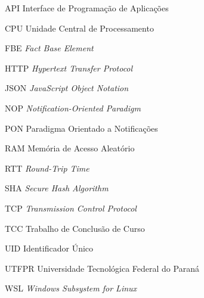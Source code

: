 \begin{siglas}
\item[API] Interface de Programação de Aplicações
\item[CPU] Unidade Central de Processamento
\item[FBE] \textit{Fact Base Element}
\item[HTTP] \textit{Hypertext Transfer Protocol}
\item[JSON] \textit{JavaScript Object Notation}
\item[NOP] \textit{Notification-Oriented Paradigm}
\item[PON] Paradigma Orientado a Notificações
\item[RAM] Memória de Acesso Aleatório
\item[RTT] \textit{Round-Trip Time}
\item[SHA] \textit{Secure Hash Algorithm}
\item[TCP] \textit{Transmission Control Protocol}
\item[TCC] Trabalho de Conclusão de Curso
\item[UID] Identificador Único
\item[UTFPR] Universidade Tecnológica Federal do Paraná
\item[WSL] \textit{Windows Subsystem for Linux}
\end{siglas}
